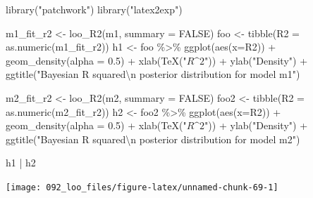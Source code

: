 \documentclass[
  10pt,
  italian,
  a4paper,
  extrafontsizes,onecolumn,openright
  ]{memoir}
\newenvironment{Shaded}{\begin{snugshade}}{\end{snugshade}}
\newcommand{\AttributeTok}[1]{\textcolor[rgb]{0.77,0.63,0.00}{#1}}
\newcommand{\ConstantTok}[1]{\textcolor[rgb]{0.00,0.00,0.00}{#1}}
\newcommand{\FloatTok}[1]{\textcolor[rgb]{0.00,0.00,0.81}{#1}}
\newcommand{\FunctionTok}[1]{\textcolor[rgb]{0.00,0.00,0.00}{#1}}
\newcommand{\NormalTok}[1]{#1}
\newcommand{\OtherTok}[1]{\textcolor[rgb]{0.56,0.35,0.01}{#1}}
\newcommand{\SpecialCharTok}[1]{\textcolor[rgb]{0.00,0.00,0.00}{#1}}
\newcommand{\StringTok}[1]{\textcolor[rgb]{0.31,0.60,0.02}{#1}}
\theoremstyle{definition}
\theoremstyle{definition}
\theoremstyle{definition}
\theoremstyle{definition}
\theoremstyle{remark}
\begin{document}
\begin{Shaded}
\begin{Highlighting}[]
\FunctionTok{library}\NormalTok{(}\StringTok{"patchwork"}\NormalTok{)}
\FunctionTok{library}\NormalTok{(}\StringTok{"latex2exp"}\NormalTok{)}

\NormalTok{m1\_fit\_r2 }\OtherTok{\textless{}{-}} \FunctionTok{loo\_R2}\NormalTok{(m1, }\AttributeTok{summary =} \ConstantTok{FALSE}\NormalTok{)}
\NormalTok{foo }\OtherTok{\textless{}{-}} \FunctionTok{tibble}\NormalTok{(}\AttributeTok{R2 =} \FunctionTok{as.numeric}\NormalTok{(m1\_fit\_r2))}
\NormalTok{h1 }\OtherTok{\textless{}{-}}\NormalTok{ foo }\SpecialCharTok{\%\textgreater{}\%} 
  \FunctionTok{ggplot}\NormalTok{(}\FunctionTok{aes}\NormalTok{(}\AttributeTok{x=}\NormalTok{R2)) }\SpecialCharTok{+}
  \FunctionTok{geom\_density}\NormalTok{(}\AttributeTok{alpha =} \FloatTok{0.5}\NormalTok{) }\SpecialCharTok{+}
  \FunctionTok{xlab}\NormalTok{(}\FunctionTok{TeX}\NormalTok{(}\StringTok{"$R\^{}2$"}\NormalTok{)) }\SpecialCharTok{+}
  \FunctionTok{ylab}\NormalTok{(}\StringTok{"Density"}\NormalTok{) }\SpecialCharTok{+}
  \FunctionTok{ggtitle}\NormalTok{(}\StringTok{"Bayesian R squared}\SpecialCharTok{\textbackslash{}n}\StringTok{ posterior distribution for model m1"}\NormalTok{)}

\NormalTok{m2\_fit\_r2 }\OtherTok{\textless{}{-}} \FunctionTok{loo\_R2}\NormalTok{(m2, }\AttributeTok{summary =} \ConstantTok{FALSE}\NormalTok{)}
\NormalTok{foo2 }\OtherTok{\textless{}{-}} \FunctionTok{tibble}\NormalTok{(}\AttributeTok{R2 =} \FunctionTok{as.numeric}\NormalTok{(m2\_fit\_r2))}
\NormalTok{h2 }\OtherTok{\textless{}{-}}\NormalTok{ foo2 }\SpecialCharTok{\%\textgreater{}\%} 
  \FunctionTok{ggplot}\NormalTok{(}\FunctionTok{aes}\NormalTok{(}\AttributeTok{x=}\NormalTok{R2)) }\SpecialCharTok{+}
  \FunctionTok{geom\_density}\NormalTok{(}\AttributeTok{alpha =} \FloatTok{0.5}\NormalTok{) }\SpecialCharTok{+}
  \FunctionTok{xlab}\NormalTok{(}\FunctionTok{TeX}\NormalTok{(}\StringTok{"$R\^{}2$"}\NormalTok{)) }\SpecialCharTok{+}
  \FunctionTok{ylab}\NormalTok{(}\StringTok{"Density"}\NormalTok{) }\SpecialCharTok{+}
  \FunctionTok{ggtitle}\NormalTok{(}\StringTok{"Bayesian R squared}\SpecialCharTok{\textbackslash{}n}\StringTok{ posterior distribution for model m2"}\NormalTok{)}

\NormalTok{h1 }\SpecialCharTok{|}\NormalTok{ h2}
\end{Highlighting}
\end{Shaded}

\begin{center}\texttt{[image: 092\_loo\_files/figure-latex/unnamed-chunk-69-1]} \end{center}
\end{document}
